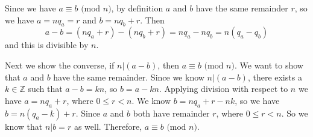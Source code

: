\documentclass[12pt, oneside]{book}
\newcommand{\Integers}{\mathbb{Z}}
\newcounter{definition}[section]
\newcommand{\modulo}[3]{{#1}\equiv{#2}\text{ (mod } {#3}\text{)}}
\begin{document}
Since we have \(\modulo{a}{b}{n}\), by definition \(a\) and \(b\) have the same remainder \(r\), so we have \(a = nq_a = r\) and \(b = nq_b + r\). Then \[a - b = (nq_a + r) - (nq_b + r) = nq_a - nq_b = n(q_a - q_b)\] and this is divisible by \(n\).

Next we show the converse, if \(n | (a-b)\), then \(\modulo{a}{b}{n}\). We want to show that \(a\) and \(b\) have the same remainder. Since we know \(n | (a-b)\), there exists a \(k \in \Integers\) such that \(a-b = kn\), so \(b = a - kn\). Applying division with respect to \(n\) we have \(a = nq_a + r\), where \(0 \leq r < n\). We know \(b = nq_a + r - nk\), so we have \(b = n(q_a - k) + r\). Since \(a\) and \(b\) both have remainder \(r\), where \(0 \leq r < n\). So we know that \(n|b = r\) as well. Therefore, \(\modulo{a}{b}{n}\).
\end{document}
